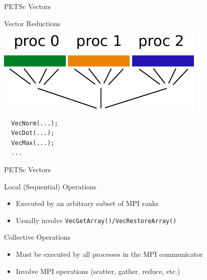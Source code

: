 \begin{frame}[fragile]{PETSc Vectors}

 \begin{block}{Vector Reductions}
   \begin{center}
     \includegraphics[width=0.75\textwidth]{figures/vectors-reduce} \\[1.2em]
\begin{lstlisting}
  VecNorm(...);
  VecDot(...);
  VecMax(...);
  ...
\end{lstlisting}
   \end{center}
 \end{block}

\end{frame}



\begin{frame}[fragile]{PETSc Vectors}

 \begin{block}{Local (Sequential) Operations}
  \begin{itemize}
   \item Executed by an arbitrary subset of MPI ranks
   \item Usually involve \lstinline|VecGetArray()/VecRestoreArray()|
  \end{itemize}
 \end{block}

 
 \begin{block}{Collective Operations}
  \begin{itemize}
   \item Must be executed by all processes in the MPI communicator
   \item Involve MPI operations (scatter, gather, reduce, etc.)
  \end{itemize}
 \end{block}

\end{frame}
